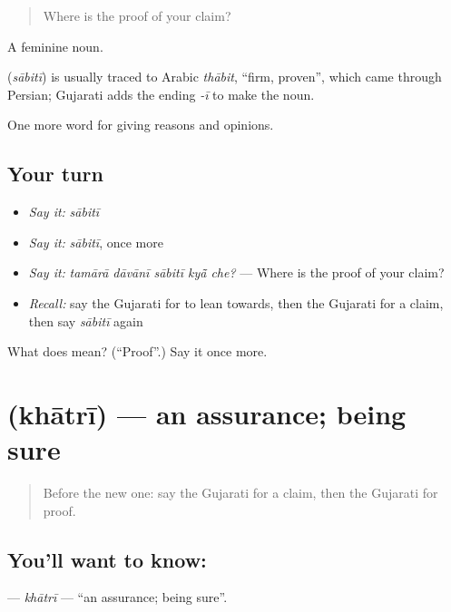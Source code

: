 \begin{quote}
Where is the proof of your claim?
\end{quote}

A feminine noun.

\begin{cousinweb}
\textbf{} (\emph{sābitī}) is usually traced to Arabic \emph{thābit}, \textquotedblleft{}firm, proven\textquotedblright{}, which came through Persian; Gujarati adds the ending \emph{-ī} to make the noun.
\end{cousinweb}

\begin{grammarlens}[title={What you've built}]
One more word for giving reasons and opinions.
\end{grammarlens}

\subsection*{Your turn}
\begin{itemize}
\raggedright
  \item \emph{Say it:} \emph{sābitī}
  \item \emph{Say it:} \emph{sābitī}, once more
  \item \emph{Say it:} \emph{tamārā dāvānī sābitī kyā̃ che?} — Where is the proof of your claim?
  \item \emph{Recall:} say the Gujarati for to lean towards, then the Gujarati for a claim, then say \emph{sābitī} again
\end{itemize}

\begin{tcolorbox}[breakable,colback=teal!4,colframe=teal!35!black,title={Before you move on}]
What does  mean? (\textquotedblleft{}Proof\textquotedblright{}.) Say it once more.
\end{tcolorbox}
\section[\texorpdfstring{\gu{ખાતરી} (khātrī)}{ખાતરી (khātrī)}]{ (khātrī) — an assurance; being sure}

\label{lesson:GU-C344-khatri}



\begin{quote}
Before the new one: say the Gujarati for a claim, then the Gujarati for proof.
\end{quote}

\subsection*{You'll want to know: }
\textbf{} — \emph{khātrī} — \textquotedblleft{}an assurance; being sure\textquotedblright{}.

